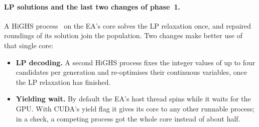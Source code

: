 \paragraph{LP solutions and the last two changes of phase~1.} A HiGHS process~\citep{huangfu2018parallelizing,highs}
on the EA's core solves the LP relaxation once, and repaired roundings of its solution join the population. Two
changes make better use of that single core:
\begin{itemize}
\item \textbf{LP decoding.} A second HiGHS process fixes the integer values of up to four candidates per generation and
  re-optimises their continuous variables, once the LP relaxation has finished.
\item \textbf{Yielding wait.} By default the EA's host thread spins while it waits for the GPU. With CUDA's yield flag
  it gives its core to any other runnable process; in a check, a competing process got the whole core instead of
  about half.
\end{itemize}
\FloatBarrier
